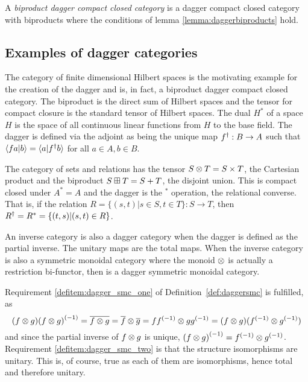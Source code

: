 \begin{definition} \label{def:biproductdaggerccc}
  A \emph{biproduct dagger compact closed category} is a dagger compact closed category with
  biproducts where the conditions of lemma \ref{lemma:daggerbiproducts} hold.
\end{definition}
\subsection{Examples of dagger categories}

\begin{example}[\fdh]\label{ex:fdhilbert_is_dagger_category}
The category of finite dimensional Hilbert spaces is the motivating example for
the creation of the dagger and is, in fact, a biproduct dagger compact closed category. The
biproduct is the direct sum of Hilbert spaces and the tensor for compact closure is the standard
tensor of Hilbert spaces. The dual $H^{*}$ of a space $H$ is the space of all continuous linear
functions from $H$ to the base field. The dagger is defined via the adjoint as being the unique map
${f}^{\dagger}:B\to A$ such that $\langle f a|b\rangle = \langle a | {f}^{\dagger} b\rangle$ for all $a\in A, b\in B$.
\end{example}

\begin{example}[\rel]\label{ex:rel_is_dagger_category}
The category \rel of sets and relations has the tensor $S\otimes T = S\times T$, the
Cartesian product and the biproduct $S\boxplus T = S+T$, the disjoint union. This is compact
closed under $A^{*} = A$ and the dagger is the ${}^*$ operation, the relational converse. That is,
if the relation $R=\{(s,t)|s\in S, t\in T\}:S\to T$, then ${R}^{\dagger}=R^*=\{(t,s)|(s,t)\in R\}$.
\end{example}

\begin{example}\label{ex:inverse_category_is_dagger_category}
An inverse category \X is also a dagger category when the dagger is defined as the partial inverse.
The unitary maps are the total maps. When the inverse category \X is also a
symmetric monoidal category where the monoid $\otimes$ is actually a restriction bi-functor, then \X is
a dagger symmetric monoidal category.

Requirement \ref{defitem:dagger_smc_one} of Definition~\ref{def:daggersmc}  is fulfilled, as
\[
  (f\otimes g) {(f\otimes g)}^{(-1)} = \overline{f\otimes g}=\overline{f} \otimes\overline{g} =
   f{f}^{(-1)} \otimes g {g}^{(-1)} = (f\otimes g) ({f}^{(-1)} \otimes {g}^{(-1)})
\]
and since the partial inverse of $f\otimes g$ is unique, ${(f\otimes g)}^{(-1)} = {f}^{(-1)} \otimes {g}^{(-1)}$.
Requirement \ref{defitem:dagger_smc_two} is that the structure isomorphisms are unitary. This is, of
course, true as each of them are isomorphisms, hence total and therefore unitary.
\end{example}
